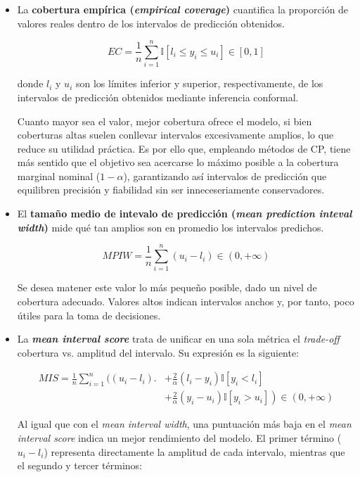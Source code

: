 \begin{itemize}
    \item La \textbf{cobertura empírica (\textit{empirical coverage})} cuantifica la proporción de valores reales dentro de los intervalos de predicción obtenidos. 
    
    $$
    EC = \frac{1}{n} 
        \sum_{i=1}^n{ \mathbb{I} \left[ l_i \le y_i \le u_i \right] } 
            \in \left[0, 1\right]
    $$

    donde $l_i$ y $u_i$ son los límites inferior y superior, respectivamente, de los intervalos de predicción obtenidos mediante inferencia conformal.

    Cuanto mayor sea el valor, mejor cobertura ofrece el modelo, si bien coberturas altas suelen conllevar intervalos excesivamente amplios, lo que reduce su utilidad práctica. Es por ello que, empleando métodos de \acrshort{CP}, tiene más sentido que el objetivo sea acercarse lo máximo posible a la cobertura marginal nominal ($1-\alpha$), garantizando así intervalos de predicción que equilibren precisión y fiabilidad sin ser inneceseriamente conservadores. 
    
    \item El \textbf{tamaño medio de intevalo de predicción (\textit{mean prediction inteval width})} mide qué tan amplios son en promedio los intervalos predichos.
    
    $$
    MPIW = \frac{1}{n} \sum_{i=1}^n{ \left( u_i - l_i \right) } \in (0, +\infty)
    $$
    
    Se desea matener este valor lo más pequeño posible, dado un nivel de cobertura adecuado. Valores altos indican intervalos anchos y, por tanto, poco útiles para la toma de decisiones. 

    \item La \textbf{\textit{mean interval score}} \cite{gneiting2007} trata de unificar en una sola métrica el \textit{trade-off} cobertura vs. amplitud del intervalo. Su expresión es la siguiente:

    \begin{align*} 
    MIS = \frac{1}{n} \sum_{i=1}^n
    \biggl( (u_i-l_i) \biggr.&+ \frac{2}{\alpha} \left( l_i-y_i \right) \mathbb{I}\left[ y_i<l_i \right] \\
    &+\left. \frac{2}{\alpha}  \left( y_i-u_i \right) \mathbb{I}\left[ y_i>u_i \right] \right)
    \in \left( 0, +\infty \right)
    \end{align*}

    Al igual que con el \textit{mean interval width}, una puntuación más baja en el \textit{mean interval score} indica un mejor rendimiento del modelo. El primer término ($u_i-l_i$) representa directamente la amplitud de cada intervalo, mientras que el segundo y tercer términos:


\end{itemize}
